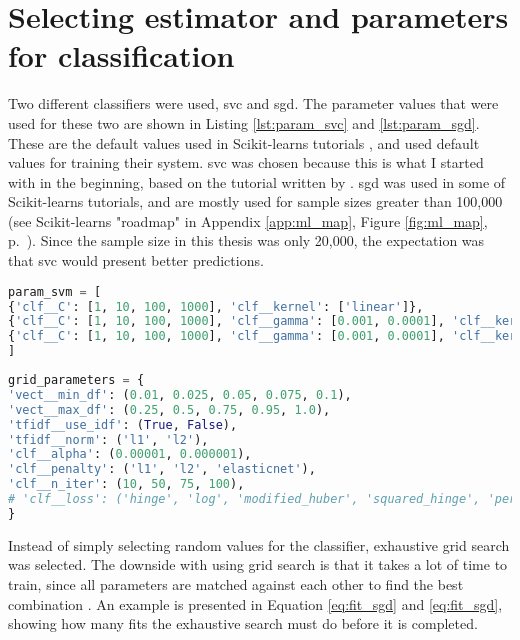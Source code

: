 \section{Selecting estimator and parameters for classification}
\label{sec:estimator_parameter_selection}
Two different classifiers were used, \gls{svc} and \gls{sgd}.
The parameter values that were used for these two are shown in Listing \ref{lst:param_svc} and  \ref{lst:param_sgd}.
These are the default values used in Scikit-learns tutorials \cite{Scikitlearn.org2016k, Scikitlearn.org2016l}, and \cite{Huang2008, Maas2011, Zhang2003} used default values for training their system.
\gls{svc} was chosen because this is what I started with in the beginning, based on the tutorial written by \cite{Rehurek2014}.
\gls{sgd} was used in some of Scikit-learns tutorials, and are mostly used for sample sizes greater than 100,000 (see Scikit-learns "roadmap" in Appendix \ref{app:ml_map}, Figure \ref{fig:ml_map},  
 p.~\pageref{app:ml_map}).
Since the sample size in this thesis was only 20,000, the expectation was that \gls{svc} would present better predictions.
\begin{lstlisting}[caption={Parameters for SVC}, label={lst:param_svc}, language={Python}] 
param_svm = [
{'clf__C': [1, 10, 100, 1000], 'clf__kernel': ['linear']},
{'clf__C': [1, 10, 100, 1000], 'clf__gamma': [0.001, 0.0001], 'clf__kernel': ['rbf']},
{'clf__C': [1, 10, 100, 1000], 'clf__gamma': [0.001, 0.0001], 'clf__kernel': ['sigmoid']},
]
\end{lstlisting}
\begin{lstlisting}[caption={Parameters for SGD}, label={lst:param_sgd}, language={Python}] 
grid_parameters = {
'vect__min_df': (0.01, 0.025, 0.05, 0.075, 0.1),
'vect__max_df': (0.25, 0.5, 0.75, 0.95, 1.0),
'tfidf__use_idf': (True, False),
'tfidf__norm': ('l1', 'l2'),
'clf__alpha': (0.00001, 0.000001),
'clf__penalty': ('l1', 'l2', 'elasticnet'),
'clf__n_iter': (10, 50, 75, 100),
# 'clf__loss': ('hinge', 'log', 'modified_huber', 'squared_hinge', 'perceptron'),
}
\end{lstlisting}
Instead of simply selecting random values for the classifier, exhaustive grid search was selected. 
The downside with using grid search is that it takes a lot of time to train, since all parameters are matched against each other to find the best combination \cite{Bishop2006, Markham2015a}.
An example is presented in Equation \ref{eq:fit_sgd} and \ref{eq:fit_sgd}, showing how many fits the exhaustive search must do before it is completed.
